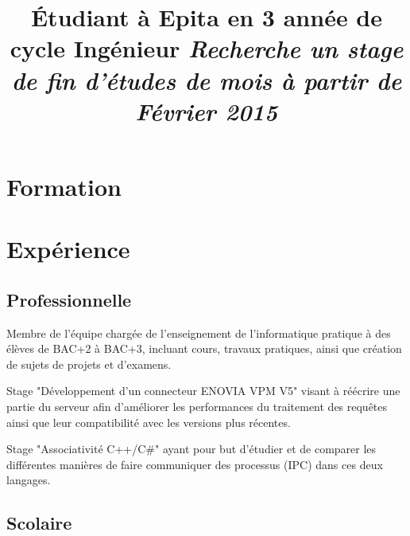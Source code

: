 \documentclass[10pt,a4paper]{moderncv}
\title{\'{E}tudiant à Epita en 3\up{ème} année\newline
de cycle Ingénieur\newline
\textit{\Large Recherche un stage de fin d'études de\newline
6 mois à partir de Février 2015}}
\begin{document}
\makecvtitle

\section{Formation}




 {}

\section{Expérience}

\subsection{Professionnelle}

{Membre de l'équipe chargée de l'enseignement de l'informatique pratique à des
élèves de BAC+2 à BAC+3, incluant cours, travaux pratiques, ainsi que création
de sujets de projets et d'examens.}

{Stage "Développement d'un connecteur ENOVIA VPM V5" visant à réécrire une
partie du serveur afin d'améliorer les performances du traitement des requêtes
ainsi que leur compatibilité avec les versions plus récentes.}

{Stage "Associativité C++/C\#" ayant pour but d'étudier et de comparer les
différentes manières de faire communiquer des processus (IPC) dans ces deux
langages.}

\subsection{Scolaire}


\end{document}
